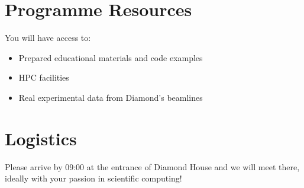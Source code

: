 \documentclass[11pt, a4paper]{article}
\begin{document}
\section*{Programme Resources}

You will have access to:
\begin{itemize}
    \item Prepared educational materials and code examples
    \item HPC facilities
    \item Real experimental data from Diamond's beamlines
\end{itemize}

\section*{Logistics}

Please arrive by 09:00 at the entrance of Diamond House and we will meet there,
ideally with your passion in scientific computing!
\end{document}
